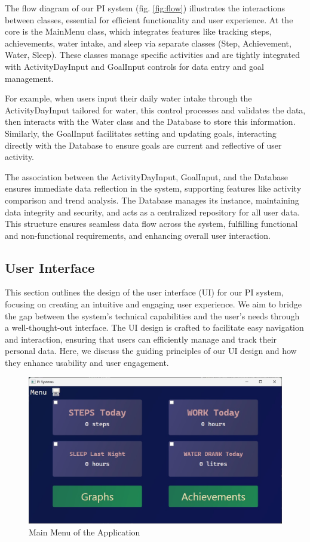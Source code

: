 \documentclass[12pt]{article}
\begin{document}
The flow diagram of our PI system (fig. \ref{fig:flow}) illustrates the
interactions between classes, essential for efficient functionality and user
experience. At the core is the MainMenu class, which integrates features like
tracking steps, achievements, water intake, and sleep via separate classes
(Step, Achievement, Water, Sleep). These classes manage specific activities and
are tightly integrated with ActivityDayInput and GoalInput controls for data
entry and goal management.\par

For example, when users input their daily water intake through the
ActivityDayInput tailored for water, this control processes and validates the
data, then interacts with the Water class and the Database to store this
information. Similarly, the GoalInput facilitates setting and updating goals,
interacting directly with the Database to ensure goals are current and
reflective of user activity.\par

The association between the ActivityDayInput, GoalInput, and the Database
ensures immediate data reflection in the system, supporting features like
activity comparison and trend analysis. The Database manages its instance,
maintaining data integrity and security, and acts as a centralized repository
for all user data. This structure ensures seamless data flow across the system,
fulfilling functional and non-functional requirements, and enhancing overall
user interaction.\par

\subsection{User Interface}

This section outlines the design of the user interface (UI) for our PI system,
focusing on creating an intuitive and engaging user experience. We aim to bridge
the gap between the system's technical capabilities and the user's needs through
a well-thought-out interface. The UI design is crafted to facilitate easy
navigation and interaction, ensuring that users can efficiently manage and track
their personal data. Here, we discuss the guiding principles of our UI design and
how they enhance usability and user engagement.\par

\begin{figure}[!ht]
  \centering
  \includegraphics[width = 0.5\linewidth]{Main Menu}
  \caption{Main Menu of the Application}
  \label{fig:Menu}
\end{figure}
\end{document}
